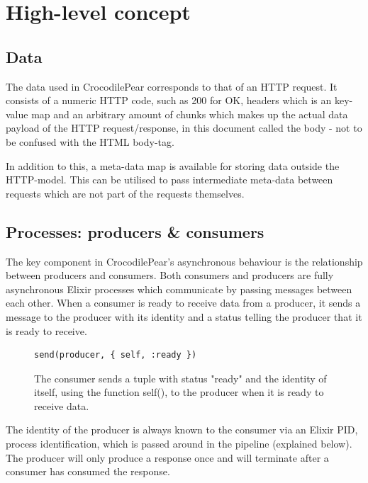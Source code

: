 \documentclass{cslthse-msc}
\begin{document}
\section{High-level concept}

\subsection{Data}
The data used in CrocodilePear corresponds to that of an HTTP request. It consists of a numeric HTTP code, such as 200 for OK, headers which is an key-value map and an arbitrary amount of chunks which makes up the actual data payload of the HTTP request/response, in this document called the body - not to be confused with the HTML body-tag. 

In addition to this, a meta-data map is available for storing data outside the HTTP-model. This can be utilised to pass intermediate meta-data between requests which are not part of the requests themselves.

\subsection{Processes: producers \& consumers}
The key component in CrocodilePear's asynchronous behaviour is the relationship between producers and consumers. Both consumers and producers are fully asynchronous Elixir processes which communicate by passing messages between each other. When a consumer is ready to receive data from a producer, it sends a message to the producer with its identity and a status telling the producer that it is ready to receive.

\begin{figure}[H]
  \centering
\begin{lstlisting}[breaklines=true,frame=single]
send(producer, { self, :ready })	
\end{lstlisting}
  \caption{The consumer sends a tuple with status "ready" and the identity of itself, using the function self(), to the producer when it is ready to receive data.}
\end{figure}

The identity of the producer is always known to the consumer via an Elixir PID, process identification, which is passed around in the pipeline (explained below). The producer will only produce a response once and will terminate after a consumer has consumed the response.
\end{document}
